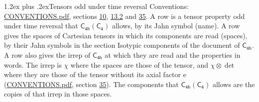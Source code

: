 \documentclass[10pt,a4paper]{article}
\makeatletter
\renewcommand\section{\@startsection{section}{1}{\z@}{-3ex plus -1ex minus -.2ex}%
  {1.2ex plus .2ex}{\normalfont\large\sffamily\bfseries\color{parttitle}}}
\numberwithin{equation}{section}
\newcommand{\grp}[1]{\mathsf{#1}}
\newcommand{\irrprod}{\otimes}
\makeatother
\begin{document}
\section{Tensors odd under time reversal}\label{s:time_odd}
Conventions: \href{../../CONVENTIONS.pdf}{CONVENTIONS.pdf}, sections \href{../../../rotation/CONVENTIONS.pdf\#conv.10}{10}, \href{../../../rotation/CONVENTIONS.pdf\#conv.13.2}{13.2} and \href{../../CONVENTIONS.pdf\#conv.35}{35}.
\leavevmode\label{n:head.name.property}A row is a tensor property odd under time reversal that $\grp{C_{4h}}(\grp{C_{4}})$ allows, by its Jahn symbol (name). \label{n:head.spaces}A row gives the spaces of Cartesian tensors in which its components are read (spaces), by their Jahn symbols in the section Isotypic components of the document of \href{../../../rotation/data/pdf/C4h.pdf}{$\grp{C_{4h}}$}. \label{n:head.properties}A row also gives the irrep of $\grp{C_{4h}}$ at which they are read and the properties in words. The irrep is $\chi$ where the spaces are those of the tensor, and $\chi \irrprod \det$ where they are those of the tensor without its axial factor e (\href{../../CONVENTIONS.pdf}{CONVENTIONS.pdf}, section \href{../../CONVENTIONS.pdf\#conv.35}{35}). The components that $\grp{C_{4h}}(\grp{C_{4}})$ allows are the copies of that irrep in those spaces.
\end{document}
